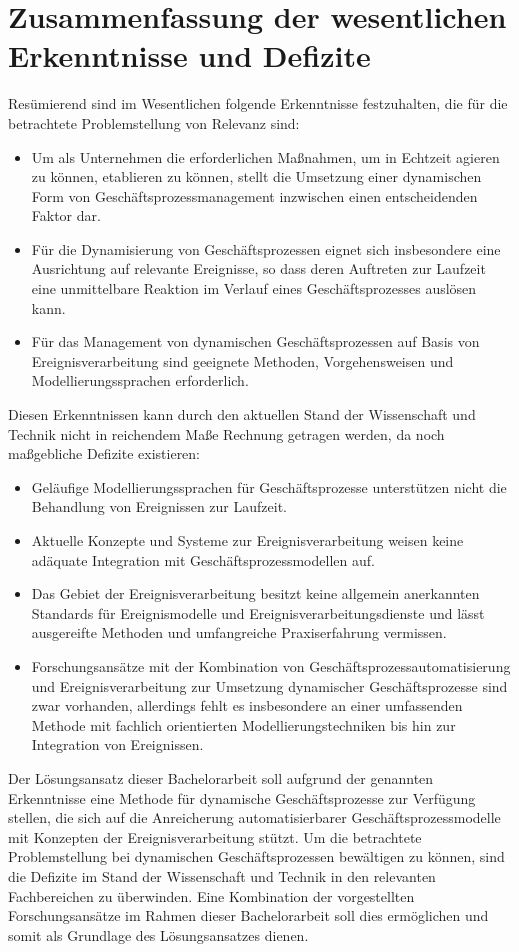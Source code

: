 \section{Zusammenfassung der wesentlichen Erkenntnisse und Defizite}\label{sec:grundlagensummary}

Resümierend sind im Wesentlichen folgende Erkenntnisse festzuhalten, die für die betrachtete Problemstellung von Relevanz sind:
\begin{itemize}
	\item 
	Um als Unternehmen die erforderlichen Maßnahmen, um in Echtzeit agieren zu können, etablieren zu können, stellt die Umsetzung einer dynamischen Form von Geschäftsprozessmanagement inzwischen einen entscheidenden Faktor dar.
    \item 
    Für die Dynamisierung von Geschäftsprozessen eignet sich insbesondere eine Ausrichtung auf relevante Ereignisse, so dass deren Auftreten zur Laufzeit eine unmittelbare Reaktion im Verlauf eines Geschäftsprozesses auslösen kann.
    \item
    Für das Management von dynamischen Geschäftsprozessen auf Basis von Ereignisverarbeitung sind geeignete Methoden, Vorgehensweisen und Modellierungssprachen erforderlich.
\end{itemize}

Diesen Erkenntnissen kann durch den aktuellen Stand der Wissenschaft und Technik nicht in
reichendem Maße Rechnung getragen werden, da noch maßgebliche Defizite existieren:
\begin{itemize}
	\item
	Geläufige Modellierungssprachen für Geschäftsprozesse unterstützen nicht die Behandlung von Ereignissen zur Laufzeit.
    \item 
    Aktuelle Konzepte und Systeme zur Ereignisverarbeitung weisen keine adäquate Integration mit Geschäftsprozessmodellen auf.
    \item
    Das Gebiet der Ereignisverarbeitung besitzt keine allgemein anerkannten Standards für Ereignismodelle und Ereignisverarbeitungsdienste und lässt ausgereifte Methoden und umfangreiche Praxiserfahrung vermissen.
    \item
    Forschungsansätze mit der Kombination von Geschäftsprozessautomatisierung und Ereignisverarbeitung zur Umsetzung dynamischer Geschäftsprozesse sind zwar vorhanden, allerdings fehlt es insbesondere an einer umfassenden Methode mit fachlich orientierten Modellierungstechniken bis hin zur Integration von Ereignissen.
\end{itemize}

Der Lösungsansatz dieser Bachelorarbeit soll aufgrund der genannten Erkenntnisse eine Methode für dynamische Geschäftsprozesse zur Verfügung stellen, die sich auf die Anreicherung automatisierbarer Geschäftsprozessmodelle mit Konzepten der Ereignisverarbeitung stützt. 
Um die betrachtete Problemstellung bei dynamischen Geschäftsprozessen bewältigen zu können, sind die Defizite im Stand der Wissenschaft und Technik in den relevanten Fachbereichen zu überwinden. Eine Kombination der vorgestellten Forschungsansätze im Rahmen dieser Bachelorarbeit soll dies ermöglichen und somit als Grundlage des Lösungsansatzes dienen.